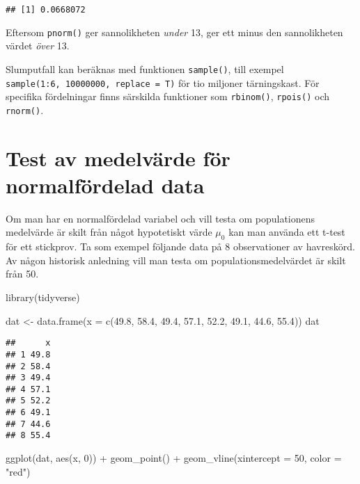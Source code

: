 \documentclass[
]{book}
\newenvironment{Shaded}{\begin{snugshade}}{\end{snugshade}}
\newcommand{\AttributeTok}[1]{\textcolor[rgb]{0.77,0.63,0.00}{#1}}
\newcommand{\DecValTok}[1]{\textcolor[rgb]{0.00,0.00,0.81}{#1}}
\newcommand{\FloatTok}[1]{\textcolor[rgb]{0.00,0.00,0.81}{#1}}
\newcommand{\FunctionTok}[1]{\textcolor[rgb]{0.00,0.00,0.00}{#1}}
\newcommand{\NormalTok}[1]{#1}
\newcommand{\OtherTok}[1]{\textcolor[rgb]{0.56,0.35,0.01}{#1}}
\newcommand{\SpecialCharTok}[1]{\textcolor[rgb]{0.00,0.00,0.00}{#1}}
\newcommand{\StringTok}[1]{\textcolor[rgb]{0.31,0.60,0.02}{#1}}
\theoremstyle{definition}
\theoremstyle{definition}
\theoremstyle{definition}
\theoremstyle{definition}
\theoremstyle{remark}
\begin{document}
\begin{verbatim}
## [1] 0.0668072
\end{verbatim}

Eftersom \texttt{pnorm()} ger sannolikheten \emph{under} 13, ger ett minus den sannolikheten värdet \emph{över} 13.

Slumputfall kan beräknas med funktionen \texttt{sample()}, till exempel \texttt{sample(1:6,\ 10000000,\ replace\ =\ T)} för tio miljoner tärningskast. För specifika fördelningar finns särskilda funktioner som \texttt{rbinom()}, \texttt{rpois()} och \texttt{rnorm()}.

\hypertarget{test-av-medelvuxe4rde-fuxf6r-normalfuxf6rdelad-data}{%
\section{Test av medelvärde för normalfördelad data}\label{test-av-medelvuxe4rde-fuxf6r-normalfuxf6rdelad-data}}

Om man har en normalfördelad variabel och vill testa om populationens medelvärde är skilt från något hypotetiskt värde \(\mu_0\) kan man använda ett t-test för ett stickprov. Ta som exempel följande data på 8 observationer av havreskörd. Av någon historisk anledning vill man testa om populationsmedelvärdet är skilt från 50.

\begin{Shaded}
\begin{Highlighting}[]
\FunctionTok{library}\NormalTok{(tidyverse)}

\NormalTok{dat }\OtherTok{\textless{}{-}} \FunctionTok{data.frame}\NormalTok{(}\AttributeTok{x =} \FunctionTok{c}\NormalTok{(}\FloatTok{49.8}\NormalTok{, }\FloatTok{58.4}\NormalTok{, }\FloatTok{49.4}\NormalTok{, }\FloatTok{57.1}\NormalTok{, }\FloatTok{52.2}\NormalTok{, }\FloatTok{49.1}\NormalTok{, }\FloatTok{44.6}\NormalTok{, }\FloatTok{55.4}\NormalTok{))}
\NormalTok{dat}
\end{Highlighting}
\end{Shaded}

\begin{verbatim}
##      x
## 1 49.8
## 2 58.4
## 3 49.4
## 4 57.1
## 5 52.2
## 6 49.1
## 7 44.6
## 8 55.4
\end{verbatim}

\begin{Shaded}
\begin{Highlighting}[]
\FunctionTok{ggplot}\NormalTok{(dat, }\FunctionTok{aes}\NormalTok{(x, }\DecValTok{0}\NormalTok{)) }\SpecialCharTok{+} 
  \FunctionTok{geom\_point}\NormalTok{() }\SpecialCharTok{+}
  \FunctionTok{geom\_vline}\NormalTok{(}\AttributeTok{xintercept =} \DecValTok{50}\NormalTok{, }\AttributeTok{color =} \StringTok{"red"}\NormalTok{)}
\end{Highlighting}
\end{Shaded}
\end{document}
